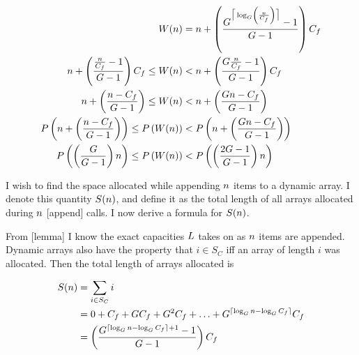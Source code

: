 \begin{align*}
W(n) &= n + \left( \frac{G^{\big\lceil \log_{G} \left( \frac {n} {C_f} \right) \big\rceil} - 1}{G - 1} \right) C_f\\
n + \left( \frac{\frac{n}{C_f} - 1}{G - 1} \right) C_f \leq W(n) &< n + \left( \frac{G\frac{n}{C_f} - 1}{G - 1} \right) C_f\\
n + \left( \frac{n - C_f}{G - 1} \right) \leq W(n) &< n + \left( \frac{Gn - C_f}{G - 1} \right)\\
P\left( n + \left( \frac{n - C_f}{G - 1} \right) \right) \leq P\left( W(n) \right) &< P\left( n + \left( \frac{Gn - C_f}{G - 1} \right) \right)\\
P\left( \left( \frac{G}{G - 1} \right) n \right) \leq P\left( W(n) \right) &< P\left( \left( \frac{2G - 1}{G - 1} \right) n \right)
\end{align*}

\scomplex

I wish to find the space allocated while appending $n$ items to a dynamic array. I denote this quantity $S(n)$, and define it as the total length of all arrays allocated during $n$ [append] calls. I now derive a formula for $S(n)$.

From [lemma] I know the exact capacities $L$ takes on as $n$ items are appended. Dynamic arrays also have the property that $i \in S_C$ iff an array of length $i$ was allocated. Then the total length of arrays allocated is

\begin{align*}
S(n) &= \sum_{i \in S_C} i\\
&= 0 + C_f + GC_f + G^2C_f + \ldots + G^{\lceil \log_{G} n - \log_{G} C_f \rceil}C_f\\
&= \left( \frac{G^{\lceil \log_{G} n - \log_{G} C_f \rceil + 1} - 1}{G - 1} \right) C_f
\end{align*}

